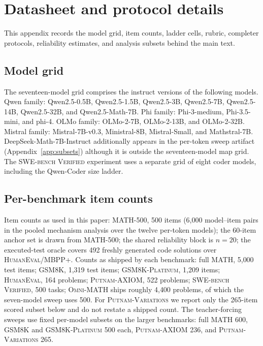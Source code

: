 \section{Datasheet and protocol details}
\label{app:dnb}

This appendix records the model grid, item counts, ladder cells, rubric, completer protocols, reliability estimates, and analysis subsets behind the main text.

\subsection{Model grid}
\label{app:models}
The seventeen-model grid comprises the instruct versions of the following models.
Qwen family: Qwen2.5-0.5B, Qwen2.5-1.5B, Qwen2.5-3B, Qwen2.5-7B, Qwen2.5-14B, Qwen2.5-32B, and Qwen2.5-Math-7B.
Phi family: Phi-3-medium, Phi-3.5-mini, and phi-4.
OLMo family: OLMo-2-7B, OLMo-2-13B, and OLMo-2-32B.
Mistral family: Mistral-7B-v0.3, Ministral-8B, Mistral-Small, and Mathstral-7B.
DeepSeek-Math-7B-Instruct additionally appears in the per-token sweep artifact (Appendix~\ref{app:subsets}) although it is outside the seventeen-model map grid.
The \textsc{SWE-bench Verified} experiment uses a separate grid of eight coder models, including the Qwen-Coder size ladder.

\subsection{Per-benchmark item counts}
\label{app:counts}
\begingroup
\sloppy
Item counts as used in this paper: \textsc{MATH-500}, 500 items (6{,}000 model--item pairs in the pooled mechanism analysis over the twelve per-token models); the 60-item anchor set is drawn from \textsc{MATH-500}; the shared reliability block is $n{=}20$; the executed-test oracle covers 492 freshly generated code solutions over \textsc{HumanEval}/\textsc{MBPP+}.
Counts as shipped by each benchmark: full \textsc{MATH}, 5{,}000 test items; \textsc{GSM8K}, 1{,}319 test items; \textsc{GSM8K-Platinum}, 1{,}209 items; \textsc{HumanEval}, 164 problems; \textsc{Putnam-AXIOM}, 522 problems; \textsc{SWE-bench Verified}, 500 tasks; \textsc{Omni-MATH} ships roughly 4{,}400 problems, of which the seven-model sweep uses 500.
For \textsc{Putnam-Variations} we report only the 265-item scored subset below and do not restate a shipped count.
The teacher-forcing sweeps use fixed per-model subsets on the larger benchmarks: full \textsc{MATH} 600, \textsc{GSM8K} and \textsc{GSM8K-Platinum} 500 each, \textsc{Putnam-AXIOM} 236, and \textsc{Putnam-Variations} 265.
\par
\endgroup

